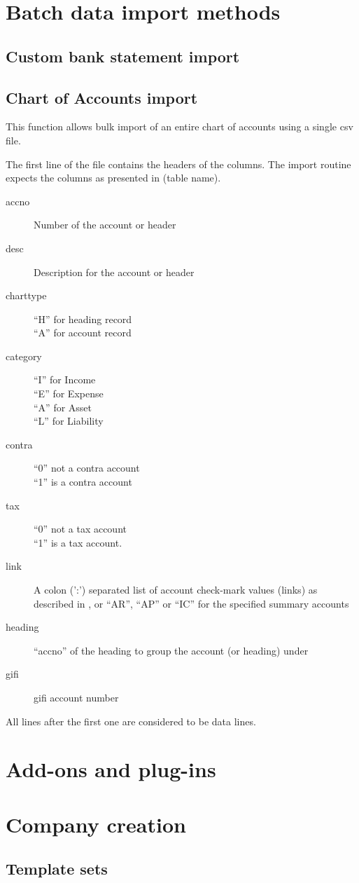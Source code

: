 \chapter{Batch data import methods}
\label{cha-customization-batch-import}

\section{Custom bank statement import}
\label{sec-customization-batch-import-bank-statement}

\section{Chart of Accounts import}
\label{subsec-customization-import-coa}

This function allows bulk import of an entire chart of accounts using a
single \gls{csv} file.

The first line of the file contains the headers of the columns. The
import routine expects the columns as presented in (table name).

\begin{description}
\item [accno] Number of the account or header
\item [desc] Description for the account or header
\item [charttype] ``H'' for heading record \\
``A'' for account record
\item [category] ``I'' for Income \\
``E'' for Expense \\
``A'' for Asset \\
``L'' for Liability
\item [contra] ``0'' not a \gls{contra} account \\
``1'' is a \gls{contra} account
\item [tax] ``0'' not a tax account \\
``1'' is a tax account.
\item [link] A colon (':') separated list of account check-mark values (links) as described
    in , or ``AR'', ``AP'' or ``IC'' for the specified summary accounts
\item [heading] ``accno'' of the heading to group the account (or heading) under
\item [gifi] \gls{gifi} account number
\end{description}

All lines after the first one are considered to be data lines.

\chapter{Add-ons and plug-ins}
\label{cha-customization-add-ons}

\chapter{Company creation}
\label{cha-customization-company-creation}

\section{Template sets}
\label{sec-customization-company-creation-templates}
